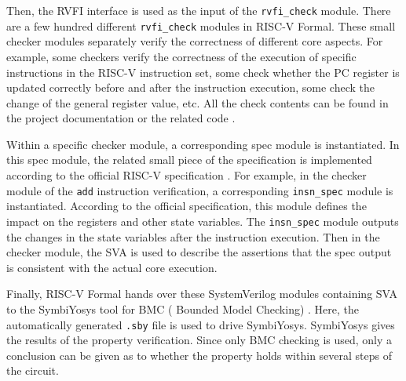 \documentclass[conference]{IEEEtran}
\theoremstyle{definition}
\begin{document}
Then, the RVFI interface is used as the input of the \verb|rvfi_check| module.
There are a few hundred different \verb|rvfi_check| modules in RISC-V Formal.
These small checker modules separately verify the correctness of different core aspects.
For example, some checkers verify the correctness of the execution of specific instructions in the RISC-V instruction set, some check whether the PC register is updated correctly before and after the instruction execution, some check the change of the general register value, etc.
All the check contents can be found in the project documentation or the related code \cite{riscv-formal}.

Within a specific checker module, a corresponding spec module is instantiated. In this spec module, the related small piece of the specification is implemented according to the official RISC-V specification \cite{waterman2014risc}.
For example, in the checker module of the \verb|add| instruction verification, a corresponding \verb|insn_spec| module is instantiated.
According to the official specification, this module defines the impact on the registers and other state variables.
The \verb|insn_spec| module outputs the changes in the state variables after the instruction execution. Then in the checker module, the SVA is used to describe the assertions that the spec output is consistent with the actual core execution.

Finally, RISC-V Formal hands over these SystemVerilog modules containing SVA to the SymbiYosys tool for BMC ( Bounded Model Checking) \cite{biere2009bounded}.
Here, the automatically generated \verb|.sby| file is used to drive SymbiYosys.
SymbiYosys gives the results of the property verification. Since only BMC checking is used, only a conclusion can be given as to whether the property holds within several steps of the circuit.
\end{document}
